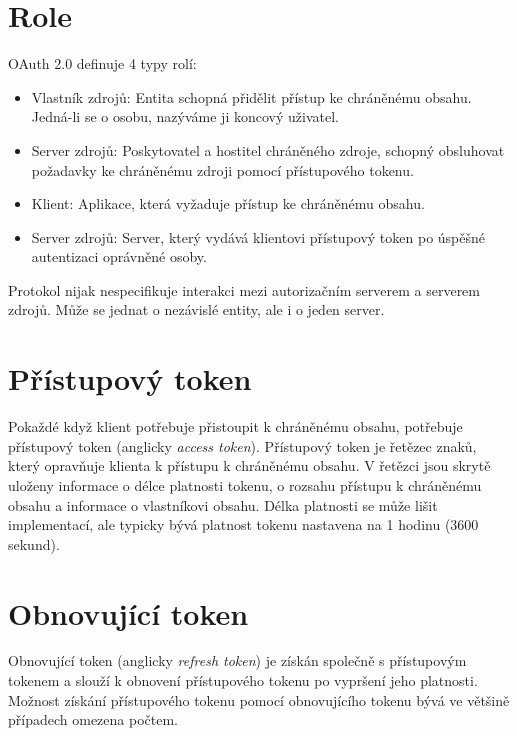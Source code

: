 \documentclass[]{fithesis3}
\begin{document}
	\section{Role}
		OAuth 2.0 definuje 4 typy rolí:

		\begin{itemize}
 		\item Vlastník zdrojů:
  		\newline
		Entita schopná přidělit přístup ke chráněnému obsahu. Jedná-li se o osobu, nazýváme ji 			koncový uživatel.
  		\item Server zdrojů:
  		\newline
		Poskytovatel a hostitel chráněného zdroje, schopný obsluhovat požadavky ke 					chráněnému zdroji pomocí přístupového tokenu.
 	 	\item Klient:
  		\newline
		Aplikace, která vyžaduje přístup ke chráněnému obsahu.
  		\item Server zdrojů:
 		\newline
		Server, který vydává klientovi přístupový token po úspěšné autentizaci oprávněné osoby.
		\end{itemize}
		Protokol nijak nespecifikuje interakci mezi autorizačním serverem a serverem zdrojů. 				Může se jednat o nezávislé entity, ale i o jeden server.

	\section{Přístupový token}	

	Pokaždé když klient potřebuje přistoupit k chráněnému obsahu, potřebuje přístupový token 			(anglicky \textit{access token}). Přístupový token je řetězec znaků, který opravňuje klienta k 		přístupu k chráněnému obsahu. V řetězci jsou skrytě uloženy informace o délce platnosti 			tokenu, o rozsahu přístupu k chráněnému obsahu a informace o vlastníkovi obsahu. Délka 			platnosti se může lišit implementací, ale typicky bývá platnost tokenu nastavena na 1 hodinu 		(3600 sekund).

	\section{Obnovující token}	

	Obnovující token (anglicky \textit{refresh token}) je získán společně s přístupovým tokenem a 		slouží k obnovení přístupového tokenu po vypršení jeho platnosti. Možnost získání 				přístupového tokenu pomocí obnovujícího tokenu bývá ve většině případech omezena počtem. 
\end{document}
